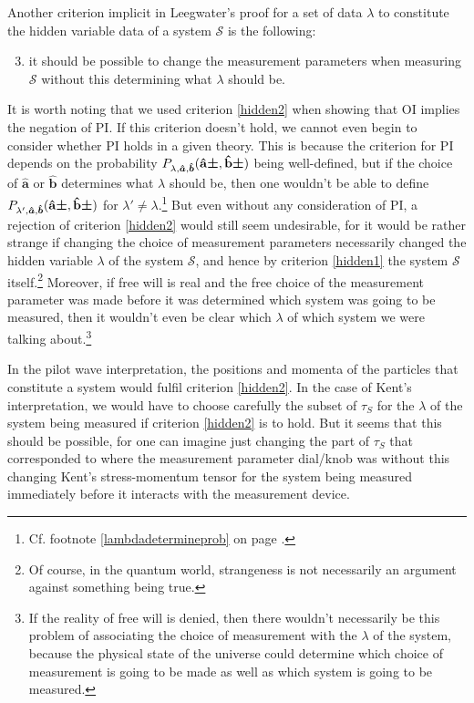 Another criterion implicit in Leegwater's proof for a set of data $\lambda$ to constitute the hidden variable data of a system $\mathcal{S}$ is the following: 
\begin{enumerate}
	\setcounter{enumi}{2}
\item \label{hidden2} it should be possible to change the measurement parameters when measuring $\mathcal{S}$ without this determining what $\lambda$ should be. 
\end{enumerate} 
It is worth noting that  we used criterion \ref{hidden2} when showing that OI implies the negation of PI. If this criterion doesn't hold, we cannot even begin to consider whether PI holds in a given theory. This is because the criterion for PI depends on the probability $P_{\lambda,\bm{\hat{a}},\bm{\hat{b}}}(\vb{\hat{{a}}}\bm{\pm},\vb{\hat{{b}}}\bm{\pm})$ being well-defined, but if the choice of $\bm{\hat{a}}$ or $\bm{\hat{b}}$ determines what $\lambda$ should be, then one wouldn't be able to define $P_{\lambda',\bm{\hat{a}},\bm{\hat{b}}}(\vb{\hat{{a}}}\bm{\pm},\vb{\hat{{b}}}\bm{\pm})$ for $\lambda'\neq\lambda$.\footnote{Cf. footnote \ref{lambdadetermineprob} on page \pageref{lambdadetermineprob}.} But even without any consideration of PI, a rejection of criterion \ref{hidden2} would still seem undesirable, for it would be rather strange if changing the choice of measurement parameters necessarily changed the hidden variable $\lambda$ of the system $\mathcal{S}$, and hence by criterion \ref{hidden1} the system $\mathcal{S}$ itself.\footnote{Of course, in the quantum world, strangeness is not necessarily an argument against something being true.} Moreover, if free will is real and the free choice of the measurement parameter was made before it was determined which system was going to be measured, then it wouldn't even be clear which $\lambda$ of which system we were talking about.\footnote{If the reality of free will is denied, then there wouldn't necessarily be this problem of associating the choice of measurement with the $\lambda$ of the system, because the physical state of the universe could determine which choice of measurement is going to be made as well as which system is going to be measured.}  

In the pilot wave interpretation, the positions and momenta of the particles that constitute a system would fulfil criterion \ref{hidden2}. In the case of Kent's interpretation, we would have to choose carefully the subset of $\tau_S$ for the $\lambda$ of the system being measured if criterion \ref{hidden2} is to hold. But it seems that this should be possible, for one can imagine just changing the part of $\tau_S$ that corresponded to where the measurement parameter dial/knob was without this changing Kent's stress-momentum tensor for the system being measured immediately before it interacts with the measurement device.   

